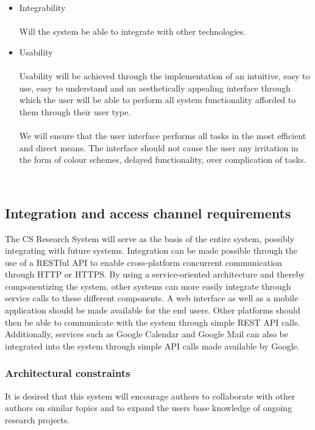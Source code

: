 \documentclass[a4paper]{article}
\begin{document}
\begin{itemize}
\begin{itemize}
        
    \item Integrability \\\\
        Will the system be able to integrate with other technologies.
    \item Usability \\\\
        Usability will be achieved through the implementation of an intuitive, easy to use, easy to understand and an aesthetically appealing interface through which the user will be able to perform all system functionality afforded to them through their user type.
        \\\\
        We will ensure that the user interface performs all tasks in the most efficient and direct means. The interface should not cause the user any irritation in the form of colour schemes, delayed functionality, over complication of tasks.
 \end{itemize}
\\

\subsection{Integration and access channel requirements}
    The CS Research System will serve as the basis of the entire system, possibly integrating with future systems. Integration can be made possible through the use of a RESTful API to enable cross-platform concurrent communication through HTTP or HTTPS. By using a service-oriented architecture and thereby componentizing the system, other systems can more easily integrate through service calls to these different components. A web interface as well as a mobile application should be made available for the end users. Other platforms should then be able to communicate with the system through simple REST API calls. Additionally, services such as Google Calendar and Google Mail can also be integrated into the system through simple API calls made available by Google. 
\\
    
\subsubsection{Architectural constraints}
   It is desired that this system will encourage authors to collaborate with other authors on similar topics and to expand the users base knowledge of ongoing research projects.
\\
    \\
    \\
    

\end{itemize}
\end{document}

